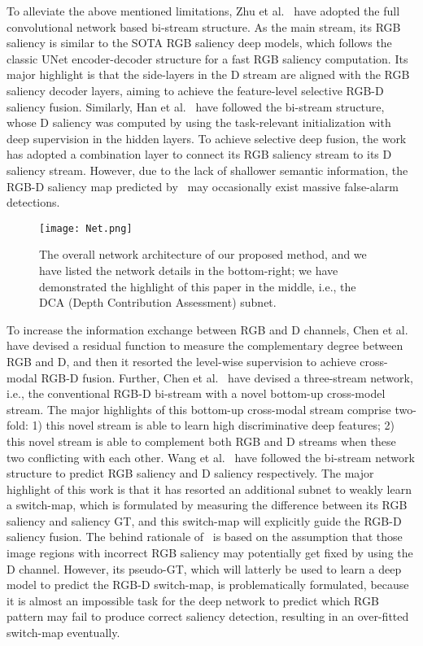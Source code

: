 \documentclass[journal]{IEEEtran}
\begin{document}
To alleviate the above mentioned limitations, Zhu et al.~\cite{Zhu2018PDNet} have adopted the full convolutional network based bi-stream structure.
As the main stream, its RGB saliency is similar to the SOTA RGB saliency deep models, which follows the classic UNet encoder-decoder structure for a fast RGB saliency computation.
Its major highlight is that the side-layers in the D stream are aligned with the RGB saliency decoder layers, aiming to achieve the feature-level selective RGB-D saliency fusion.
Similarly, Han et al.~\cite{han2017cnns} have followed the bi-stream structure, whose D saliency was computed by using the task-relevant initialization with deep supervision in the hidden layers.
To achieve selective deep fusion, the work~\cite{han2017cnns} has adopted a combination layer to connect its RGB saliency stream to its D saliency stream.
However, due to the lack of shallower semantic information, the RGB-D saliency map predicted by~\cite{han2017cnns} may occasionally exist massive false-alarm detections.


\begin{figure*}
\begin{center}
\texttt{[image: Net.png]}
\end{center}
\captionsetup{justification=centering}
   \caption{The overall network architecture of our proposed method, and we have listed the network details in the bottom-right; we have demonstrated the highlight of this paper in the middle, i.e., the DCA (Depth Contribution Assessment) subnet.}
\label{fig:Net}
\end{figure*}

To increase the information exchange between RGB and D channels, Chen et al.~\cite{chen2018progressively} have devised a residual function to measure the complementary degree between RGB and D, and then it resorted the level-wise supervision to achieve cross-modal RGB-D fusion.
Further, Chen et al.~\cite{chen2019three} have devised a three-stream network, i.e., the conventional RGB-D bi-stream with a novel bottom-up cross-model stream.
The major highlights of this bottom-up cross-modal stream comprise two-fold: 1) this novel stream is able to learn high discriminative deep features; 2) this novel stream is able to complement both RGB and D streams when these two conflicting with each other.
Wang et al.~\cite{wang2019adaptive} have followed the bi-stream network structure to predict RGB saliency and D saliency respectively.
The major highlight of this work is that it has resorted an additional subnet to weakly learn a switch-map, which is formulated by measuring the difference between its RGB saliency and saliency GT, and this switch-map will explicitly guide the RGB-D saliency fusion.
The behind rationale of~\cite{wang2019adaptive} is based on the assumption that those image regions with incorrect RGB saliency may potentially get fixed by using the D channel.
However, its pseudo-GT, which will latterly be used to learn a deep model to predict the RGB-D switch-map, is problematically formulated, because it is almost an impossible task for the deep network to predict which RGB pattern may fail to produce correct saliency detection, resulting in an over-fitted switch-map eventually.
\end{document}
